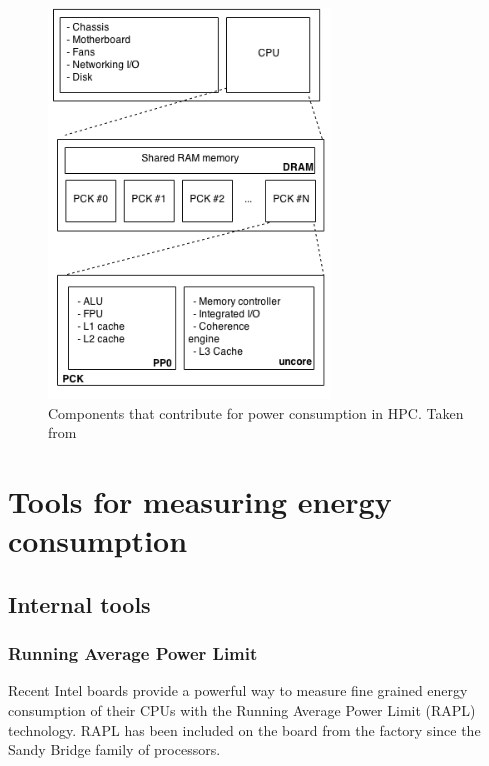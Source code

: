 \begin{figure}[tbp]
\centering
\includegraphics[width=75mm]{img/energy_model.png}
\caption{Components that contribute for power consumption in HPC. Taken from \cite{ACAT}}
\label{fig:power-consumption-model}
\end{figure}

\section{Tools for measuring energy consumption}

\subsection*{Internal tools}

\subsubsection*{Running Average Power Limit}
Recent Intel boards provide a powerful way to measure fine grained energy consumption of their CPUs with the Running Average Power Limit (RAPL) technology. RAPL has been included on the board from the factory since the Sandy Bridge family of processors.

